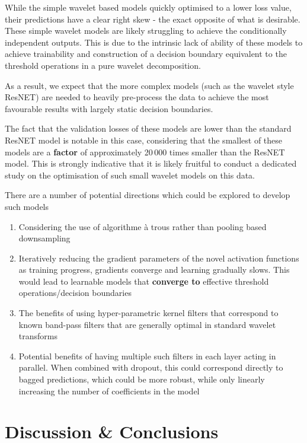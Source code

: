 \documentclass[9pt,conference]{IEEEtran}
\begin{document}
While the simple wavelet based models quickly optimised to a lower loss value, their predictions have a clear right skew - the exact opposite of what is desirable. These simple wavelet models are likely struggling to achieve the conditionally independent outputs. This is due to the intrinsic lack of ability of these models to achieve trainability and construction of a decision boundary equivalent to the threshold operations in a pure wavelet decomposition.

As a result, we expect that the more complex models (such as the wavelet style ResNET) are needed to heavily pre-process the data to achieve the most favourable results with largely static decision boundaries.

The fact that the validation losses of these models are lower than the standard ResNET model is notable in this case, considering that the smallest of these models are a \textbf{factor} of approximately 20\,000 times smaller than the ResNET model. This is strongly indicative that it is likely fruitful to conduct a dedicated study on the optimisation of such small wavelet models on this data.

There are a number of potential directions which could be explored to develop such models

\begin{enumerate}
    \item Considering the use of algorithme à trous rather than pooling based downsampling
    \item Iteratively reducing the gradient parameters of the novel activation functions as training progress, gradients converge and learning gradually slows. This would lead to learnable models that \textbf{converge to} effective threshold operations/decision boundaries
    \item The benefits of using hyper-parametric kernel filters that correspond to known band-pass filters that are generally optimal in standard wavelet transforms
    \item Potential benefits of having multiple such filters in each layer acting in parallel. When combined with dropout, this could correspond directly to bagged predictions, which could be more robust, while only linearly increasing the  number of coefficients in the model
\end{enumerate}

\section{Discussion \& Conclusions}
\end{document}
